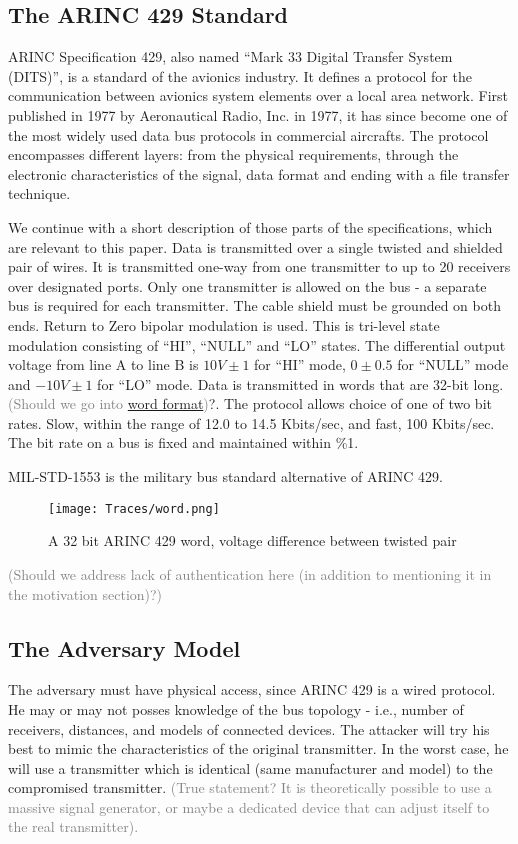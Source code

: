 \documentclass[conference]{IEEEtran}
\begin{document}
\subsection{The ARINC 429 Standard}
  ARINC Specification 429, also named ``Mark 33 Digital Transfer System (DITS)'', is a standard of the avionics industry. It defines a protocol for the communication between avionics system elements over a local area network. First published in 1977 by Aeronautical Radio, Inc. in 1977, it has since become one of the most widely used data bus protocols in commercial aircrafts. The protocol encompasses different layers: from the physical requirements, through the electronic characteristics of the signal, data format and ending with a file transfer technique.

  We continue with a short description of those parts of the specifications, which are relevant to this paper.
  Data is transmitted over a single twisted and shielded pair of wires. It is transmitted one-way from one transmitter to up to 20 receivers over designated ports. Only one transmitter is allowed on the bus - a separate bus is required for each transmitter. The cable shield must be grounded on both ends. Return to Zero bipolar modulation is used. This is tri-level state modulation consisting of ``HI'', ``NULL'' and ``LO'' states. The differential output voltage from line A to line B is $10V \pm 1$ for ``HI'' mode, $0 \pm 0.5$ for ``NULL'' mode and $-10V \pm 1$ for ``LO'' mode. Data is transmitted in words that are 32-bit long. \textcolor{gray}{(Should we go into \href{https://en.wikipedia.org/wiki/ARINC_429#Word_format}{word format})}?. The protocol allows choice of one of two bit rates. Slow, within the range of 12.0 to 14.5 Kbits/sec, and fast, 100 Kbits/sec. The bit rate on a bus is fixed and maintained within \%1.
  
  MIL-STD-1553 is the military bus standard alternative of ARINC 429.
  
  \begin{figure}[t]
    \centering
    \texttt{[image: Traces/word.png]}
    \caption{A 32 bit ARINC 429 word, voltage difference between twisted pair}
    \label{fig:word_example}
  \end{figure}
  
  \textcolor{gray}{(Should we address lack of authentication here (in addition to mentioning it in the motivation section)?)}

\subsection{The Adversary Model}
  The adversary must have physical access, since ARINC 429 is a wired protocol. He may or may not posses knowledge of the bus topology - i.e., number of receivers, distances, and models of connected devices. The attacker will try his best to mimic the characteristics of the original transmitter. In the worst case, he will use a transmitter which is identical (same manufacturer and model) to the compromised transmitter. \textcolor{gray}{(True statement? It is theoretically possible to use a massive signal generator, or maybe a dedicated device that can adjust itself to the real transmitter).}
\end{document}
